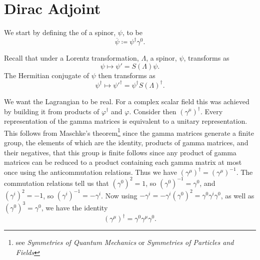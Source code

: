 \documentclass[fleqn]{NotesClass}
\newcommand*{\course}[1]{\textit{#1}}
\newcommand{\hermit}{{\dagger}}
\newcommand{\diracadjoint}[1]{\overbar{#1}}
\begin{document}
    \section{Dirac Adjoint}
    We start by defining the  of a spinor, \(\psi\), to be
    \begin{equation}
        \diracadjoint{\psi} \coloneqq \psi^\hermit \gamma^0.
    \end{equation}

    Recall that under a Lorentz transformation, \(\Lambda\), a spinor, \(\psi\), transforms as
    \begin{equation}
        \psi \mapsto \psi' = S(\Lambda)\psi.
    \end{equation}
    The Hermitian conjugate of \(\psi\) then transforms as
    \begin{equation}
        \psi^\hermit \mapsto \psi'^\hermit = \psi^\hermit S(\Lambda)^\hermit.
    \end{equation}
    
    We want the Lagrangian to be real.
    For a complex scalar field this was achieved by building it from products of \(\varphi^\hermit\) and \(\varphi\).
    Consider then \((\gamma^\mu)^\hermit\).
    Every representation of the gamma matrices is equivalent to a unitary representation.
    This follows from Maschke's theorem\footnote{see \course{Symmetries of Quantum Mechanics} or \course{Symmetries of Particles and Fields}} since the gamma matrices generate a finite group, the elements of which are the identity, products of gamma matrices, and their negatives, that this group is finite follows since any product of gamma matrices can be reduced to a product containing each gamma matrix at most once using the anticommutation relations.
    Thus we have \((\gamma^\mu)^\hermit = (\gamma^\mu)^{-1}\).
    The commutation relations tell us that \((\gamma^0)^2 = 1\), so \((\gamma^0)^{-1} = \gamma^0\), and \((\gamma^i)^2 = -1\), so \((\gamma^i)^{-1} = -\gamma^i\).
    Now using \(-\gamma^i = -\gamma^i(\gamma^0)^2 = \gamma^0\gamma^i\gamma^0\), as well as \((\gamma^0)^3 = \gamma^0\), we have the identity
    \begin{equation}
        (\gamma^\mu)^\hermit = \gamma^0\gamma^\mu\gamma^0.
    \end{equation}
    
\end{document}
